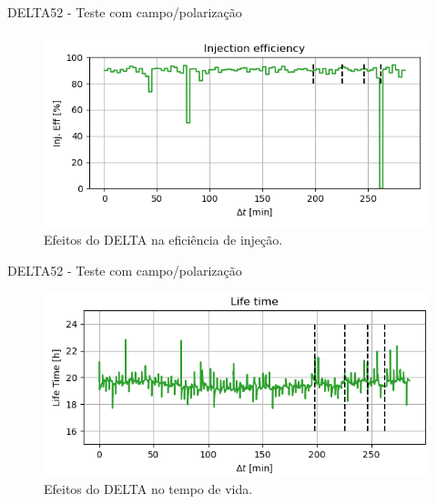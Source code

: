 \documentclass{beamer}					  %
\begin{document}
\begin{frame}{DELTA52 - Teste com campo/polarização}
            \begin{figure}[H]
    		\centering
            \includegraphics[width=1\textwidth]{2023-12-12/figures/inj_eff.png}
            \caption{Efeitos do DELTA na eficiência de injeção.}
            \label{fig:inj_eff}
    \end{figure}
\end{frame}

\begin{frame}{DELTA52 - Teste com campo/polarização}
            \begin{figure}[H]
    		\centering
            \includegraphics[width=1\textwidth]{2023-12-12/figures/lifetime.png}
            \caption{Efeitos do DELTA no tempo de vida.}
            \label{fig:lifetime}
    \end{figure}
\end{frame}
\end{document}
